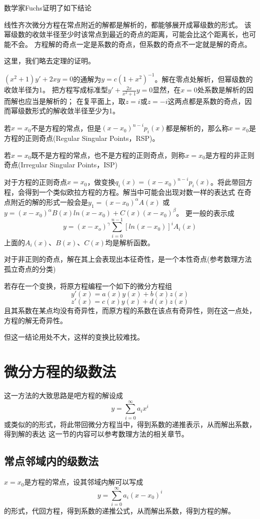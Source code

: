 数学家Fuchs证明了如下结论
\begin{theorem}
    线性齐次微分方程在常点附近的解都是解析的，都能够展开成幂级数的形式。
    该幂级数的收敛半径至少时该常点到最近的奇点的距离，可能会比这个距离长，也可能不会。
    方程解的奇点一定是系数的奇点，但系数的奇点不一定就是解的奇点。
\end{theorem}
这里，我们略去定理的证明。
\begin{example}
    $(x^2+1)y'+2xy=0$的通解为$y=c(1+x^2)^{-1}$。解在零点处解析，但幂级数的收敛半径为1。
    把方程写成标准型$y'+\frac{2x}{x^2+1}y=0$显然，在$x=0$处系数是解析的因而解也应当是解析的；
    在复平面上，取$z=i$或$z=-i$这两点都是系数的奇点，因而幂级数形式的解收敛半径至少为1。
\end{example}
\begin{definition}
    若$x=x_0$不是方程的常点，但是$(x-x_0)^{n-i}p_i(x)$都是解析的，那么称$x=x_0$是方程的正则奇点(Regular Singular Points，RSP)。
\end{definition}
\begin{definition}
    若$x=x_0$既不是方程的常点，也不是方程的正则奇点，则称$x=x_0$是方程的非正则奇点(Irregular Singular Points，ISP)
\end{definition}
对于方程的正则奇点$x=x_0$，做变换$q_i(x)=(x-x_0)^{n-i}p_i(x)$。将此带回方程，会得到一个类似欧拉方程的方程。解当中可能会出现对数一样的表达式
在奇点附近的解的形式一般会是$y_1=(x-x_0)^{\alpha}A(x)$
或$y=(x-x_0)^{\alpha}B(x)ln(x-x_0)+C(x)(x-x_0)^{\beta}$。
更一般的表示成$$y=(x-x_o)^{\gamma}\sum_{i=0}^{n-1}[ln(x-x_0)]^iA_i(x)$$
上面的$A_i(x)$、$B(x)$、$C(x)$均是解析函数。

对于非正则的奇点，解在其上会表现出本征奇性，是一个本性奇点(参考数理方法孤立奇点的分类)

若存在一个变换，将原方程编程一个如下的微分方程组
$$y'(x)=a(x)y(x)+b(x)z(x)$$
$$z'(x)=c(x)y(x)+d(x)z(x)$$
且其系数在某点均没有奇异性，而原方程的系数在该点有奇异性，则在这一点处，方程的解无奇异性。

但这一结论用处不大，这样的变换比较难找。

\section{微分方程的级数法}

这一方法的大致思路是吧方程的解设成
$$y=\sum_{i=0}^{\infty}a_ix^i$$
或类似的的形式，将此带回微分方程当中，得到系数的递推表示，从而解出系数，得到解的表达
这一节的内容可以参考数理方法的相关章节。
\subsection{常点邻域内的级数法}
$x=x_0$是方程的常点，设其邻域内解可以写成$$y=\sum_{i=0}^{\infty}a_i(x-x_0)^i$$
的形式，代回方程，得到系数的递推公式，从而解出系数，得到方程的解。

